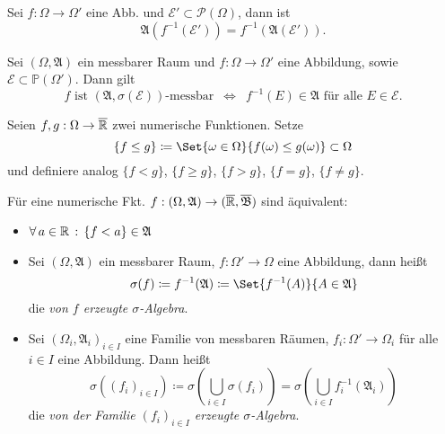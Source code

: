 \documentclass{cheat-sheet}
\newcommand{\Alg}{\mathfrak{A}} %
\renewcommand{\P}{\mathbb{P}}
\newcommand{\ER}{\overline\R} %
\newcommand{\Bor}{\mathfrak{B}} %
\begin{document}
\begin{lem}
  Sei $f : \Omega \to \Omega'$ eine Abb. und $\mathcal{E}' \subset \mathcal{P}(\Omega)$, dann ist
  \[ \Alg(f^{-1}(\mathcal{E}')) = f^{-1}(\Alg(\mathcal{E}')). \]
\end{lem}

\begin{lem}
  Sei $(\Omega, \Alg)$ ein messbarer Raum und $f : \Omega \to \Omega'$ eine Abbildung, sowie $\mathcal{E} \subset \P(\Omega')$. Dann gilt
  \[ f \text{ ist $(\Alg, \sigma(\mathcal{E}))$-messbar} \enspace \iff \enspace f^{-1}(E) \in \Alg \text{ für alle } E \in \mathcal{E}. \]
\end{lem}

\begin{nota}
  Seien $f, g : \Omega \to \overline{\mathbb{R}}$ zwei numerische Funktionen. Setze
    \[ \{ f \leq g \} \coloneqq \Set{ \omega \in \Omega }{ f(\omega) \leq g(\omega) } \subset \Omega \]
  und definiere analog $\{ f < g \}$, $\{ f \geq g \}$, $\{ f > g \}$, $\{ f = g \}$, $\{ f \not= g \}$.
\end{nota}

\begin{satz}
  Für eine numerische Fkt. $f : (\Omega, \Alg) \to (\ER, \overline{\Bor})$ sind äquivalent:
  \begin{itemize}
    \miniitem{0.7 \linewidth}{$\forall \, a \in \R \,:\, \{ f \geq a \} = f^{-1}([a, \infty]) \in \Alg$}
    \item $\forall \, a \in \R \,:\, \{ f < a \} \in \Alg$
  \end{itemize}
\end{satz}

\begin{defn}
  \begin{itemize}
    \item Sei $(\Omega, \Alg)$ ein messbarer Raum, $f : \Omega' \to \Omega$ eine Abbildung, dann heißt
    \[ \sigma(f) \coloneqq f^{-1}(\Alg) \coloneqq \Set{ f^{-1}(A) }{ A \in \Alg } \]
    die \emph{von $f$ erzeugte $\sigma$-Algebra}.
    \item Sei $(\Omega_i, \Alg_i)_{i \in I}$ eine Familie von messbaren Räumen, $f_i : \Omega' \to \Omega_i$ für alle $i \in I$ eine Abbildung. Dann heißt
    \[ \sigma((f_i)_{i \in I}) \coloneqq \sigma(\bigcup_{i \in I} \sigma(f_i)) = \sigma(\bigcup_{i \in I} f_i^{-1}(\Alg_i)) \]
    die \emph{von der Familie $(f_i)_{i \in I}$ erzeugte $\sigma$-Algebra}.
  \end{itemize}
\end{defn}
\end{document}
